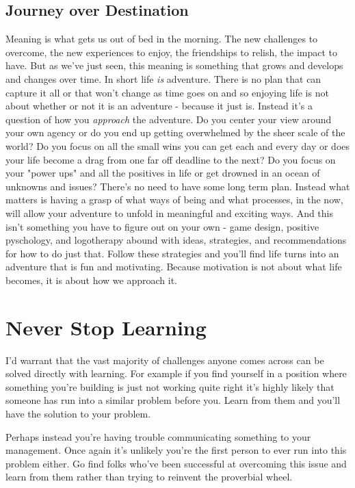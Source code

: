 \documentclass[11pt,a5paper]{book}
\begin{document}
\section{Journey over Destination}
Meaning is what gets us out of bed in the morning. The new challenges to overcome, the new experiences to enjoy, the friendships to relish, the impact to have. But as we've just seen, this meaning is something that grows and develops and changes over time. In short life \textit{is} adventure. There is no plan that can capture it all or that won't change as time goes on and so enjoying life is not about whether or not it is an adventure - because it just is. Instead it's a question of how you \textit{approach} the adventure. Do you center your view around your own agency or do you end up getting overwhelmed by the sheer scale of the world? Do you focus on all the small wins you can get each and every day or does your life become a drag from one far off deadline to the next? Do you focus on your "power ups" and all the positives in life or get drowned in an ocean of unknowns and issues? There's no need to have some long term plan. Instead what matters is having a grasp of what ways of being and what processes, in the now, will allow your adventure to unfold in meaningful and exciting ways. And this isn't something you have to figure out on your own - game design, positive pyschology, and logotherapy abound with ideas, strategies, and recommendations for how to do just that. Follow these strategies and you'll find life turns into an adventure that is fun and motivating. Because motivation is not about what life becomes, it is about how we approach it.

\chapter{Never Stop Learning}
I'd warrant that the vast majority of challenges anyone comes across can be solved directly with learning. For example if you find yourself in a position where something you're building is just not working quite right it's highly likely that someone has run into a similar problem before you. Learn from them and you'll have the solution to your problem. 
\newline

Perhaps instead you're having trouble communicating something to your management. Once again it's unlikely you're the first person to ever run into this problem either. Go find folks who've been successful at overcoming this issue and learn from them rather than trying to reinvent the proverbial wheel. 
\newline
\end{document}
